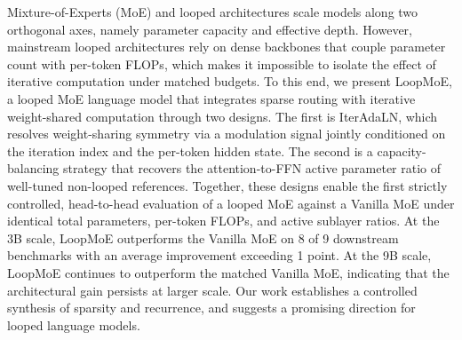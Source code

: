 
Mixture-of-Experts (MoE) and looped architectures scale models along two orthogonal axes, namely parameter capacity and effective depth. However, mainstream looped architectures rely on dense backbones that couple parameter count with per-token FLOPs, which makes it impossible to isolate the effect of iterative computation under matched budgets. To this end, we present LoopMoE, a looped MoE language model that integrates sparse routing with iterative weight-shared computation through two designs. The first is IterAdaLN, which resolves weight-sharing symmetry via a modulation signal jointly conditioned on the iteration index and the per-token hidden state. The second is a capacity-balancing strategy that recovers the attention-to-FFN active parameter ratio of well-tuned non-looped references. Together, these designs enable the first strictly controlled, head-to-head evaluation of a looped MoE against a Vanilla MoE under identical total parameters, per-token FLOPs, and active sublayer ratios. At the 3B scale, LoopMoE outperforms the Vanilla MoE on 8 of 9 downstream benchmarks with an average improvement exceeding 1 point. At the 9B scale, LoopMoE continues to outperform the matched Vanilla MoE, indicating that the architectural gain persists at larger scale. Our work establishes a controlled synthesis of sparsity and recurrence, and suggests a promising direction for looped language models.